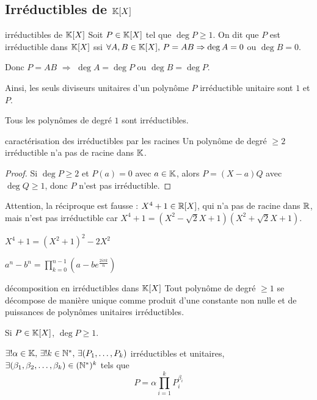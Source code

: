 \subsection{Irréductibles de \texorpdfstring{$\mathbb{K}[X]$}{K[X]}}

\begin{definition}{irréductibles de $\mathbb{K}[X]$}{}
    Soit $P \in \mathbb{K}[X]$ tel que $\deg P \geqslant 1$. On dit que $P$ est irréductible 
    dans $\mathbb{K}[X]$ ssi $\forall A, B \in \mathbb{K}[X], \, P = AB \Rightarrow \deg A = 0$ ou $\deg B = 0$.

    Donc $P = AB$ $\Rightarrow$ $\deg A = \deg P$ ou $\deg B = \deg P$.

    Ainsi, les seuls diviseurs unitaires d'un polynôme $P$ irréductible unitaire sont 
    $1$ et $P$.
\end{definition}

\begin{exemple}
    Tous les polynômes de degré $1$ sont irréductibles.
\end{exemple}


\begin{proposition}{caractérisation des irréductibles par les racines}{}
    Un polynôme de degré $\geqslant 2$ irréductible n'a pas de racine dans $\mathbb{K}$.
\end{proposition}

\begin{proof}
    Si $\deg P \geqslant 2$ et $P(a) = 0$ avec $a \in \mathbb{K}$, alors
    $P = (X - a) Q$ avec $\deg Q \geqslant 1$, donc $P$ n'est pas irréductible.
\end{proof}

\begin{remarque}
    Attention, la réciproque est fausse :
    $X^4 + 1 \in \mathbb{R}[X]$, qui n'a pas de racine dans $\mathbb{R}$, mais n'est pas irréductible car 
    $X^4 + 1 = (X^2 - \sqrt 2 X + 1)(X^2 + \sqrt 2 X + 1)$.
\end{remarque}


\avspace $X^4 + 1 = (X^2 + 1)^2 - 2X^2$

$\displaystyle a^n - b^n = \prod_{k = 0}^{n - 1} (a - b e^{\frac{2i\pi k} n})$

\begin{theoreme}{décomposition en irréductibles dans $\mathbb{K}[X]$}{}
    Tout polynôme de degré $\geqslant 1$ se décompose de manière unique comme produit d'une constante 
    non nulle et de puissances de polynômes unitaires irréductibles. 

    Si $ P \in \mathbb{K}[X]$, $\deg P \geqslant 1$. 

    $\exists ! \alpha \in \mathbb{K}, \, \exists ! k \in \mathbb{N}^*, \, \exists (P_1, \ldots, P_k)$ irréductibles et unitaires, 
    $\exists (\beta_1, \beta_2, \ldots, \beta_k) \in (\mathbb{N}^*)^k$ tels que
    $$P = \alpha \prod_{i = 1}^k P_i^{\beta_i}$$
\end{theoreme}

